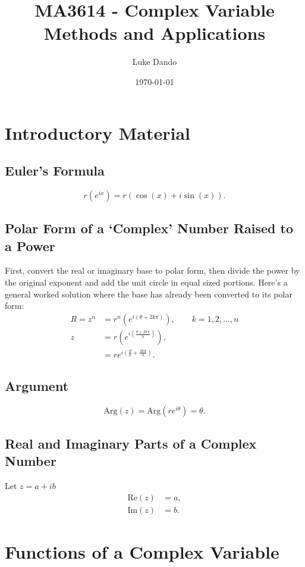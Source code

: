 \documentclass{article}
\title{MA3614 - Complex Variable Methods and Applications}
\author{Luke Dando}
\date{\today}
\begin{document}
\maketitle

\tableofcontents

\section{Introductory Material}
\subsection{Euler's Formula}
\begin{equation}
    r(e^{ix})= r(\cos(x)+i\sin(x)).
\end{equation}

\subsection{Polar Form of a `Complex' Number Raised to a Power}
First, convert the real or imaginary base to polar form, then divide the power by the original exponent and add the unit circle in equal sized portions. Here's a general worked solution where the base has already been converted to its polar form:
\begin{align}
    R=z^n&=r^n(e^{i(\theta+2k\pi)}),\quad \quad k = 1,2,\ldots,n\\
    z&=r(e^{i(\frac{\theta+2k\pi}{n})}),\\
    &=re^{i(\frac{\theta}{n}+\frac{2k\pi}{n})}.
\end{align}

\subsection{Argument}
\begin{equation}
    \text{Arg}(z)=\text{Arg}(re^{i\theta})=\theta.
\end{equation}

\subsection{Real and Imaginary Parts of a Complex Number}
Let $z=a+ib$
\begin{align}
    \text{Re}(z) &= a,\\
    \text{Im}(z) &= b.
\end{align}

\section{Functions of a Complex Variable}
\end{document}
